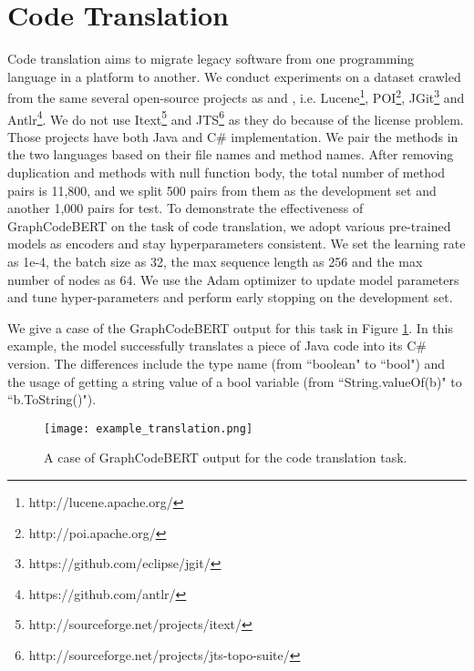 \documentclass{article} \usepackage{iclr2021_conference,times}
\begin{document}
\section{Code Translation}
Code translation aims to migrate legacy software from one programming language in a platform to another. We conduct experiments on a dataset crawled from the same several open-source projects as \citet{nguyen2015divide} and \citet{chen2018tree}, i.e. Lucene\footnote{http://lucene.apache.org/}, POI\footnote{http://poi.apache.org/}, JGit\footnote{https://github.com/eclipse/jgit/}  and Antlr\footnote{https://github.com/antlr/}. We do not use Itext\footnote{http://sourceforge.net/projects/itext/} and JTS\footnote{http://sourceforge.net/projects/jts-topo-suite/} as they do because of the license problem.  
Those projects have both Java and C\# implementation. We pair the methods in the two languages based on their file names and method names. After removing duplication and methods with null function body, the total number of method pairs is 11,800, and we split 500 pairs from them as the development set and another 1,000 pairs for test.
To demonstrate the effectiveness of GraphCodeBERT on the task of code translation, we adopt various pre-trained models as encoders and stay hyperparameters consistent. We set the learning rate as 1e-4, the batch size as 32, the max sequence length as 256 and the max number of nodes as 64. We use the Adam optimizer to update model parameters and tune hyper-parameters and perform early stopping on the development set. 

We give a case of the GraphCodeBERT output for this task in Figure \ref{example_translation}. In this example, the model successfully translates a piece of Java code into its C\# version. The differences include the type name (from ``boolean" to ``bool") and the usage of getting a string value of a bool variable (from ``String.valueOf(b)" to ``b.ToString()").  

\begin{figure}[h]
\begin{center}
		\texttt{[image: example\_translation.png]}
		\caption{A case of GraphCodeBERT output for the code translation task.}
		\label{example_translation}
	\end{center}
\end{figure}
 
\end{document}

